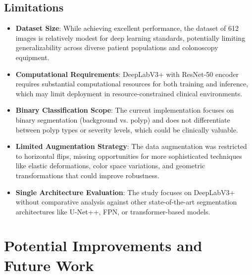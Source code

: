 \documentclass[a4paper,12pt]{report}
\begin{document}
\subsection{Limitations}
\begin{itemize}
    \item \textbf{Dataset Size}: While achieving excellent performance, the dataset of 612 images is relatively modest for deep learning standards, potentially limiting generalizability across diverse patient populations and colonoscopy equipment.
    \item \textbf{Computational Requirements}: DeepLabV3+ with ResNet-50 encoder requires substantial computational resources for both training and inference, which may limit deployment in resource-constrained clinical environments.
    \item \textbf{Binary Classification Scope}: The current implementation focuses on binary segmentation (background vs. polyp) and does not differentiate between polyp types or severity levels, which could be clinically valuable.
    \item \textbf{Limited Augmentation Strategy}: The data augmentation was restricted to horizontal flips, missing opportunities for more sophisticated techniques like elastic deformations, color space variations, and geometric transformations that could improve robustness.
    \item \textbf{Single Architecture Evaluation}: The study focuses on DeepLabV3+ without comparative analysis against other state-of-the-art segmentation architectures like U-Net++, FPN, or transformer-based models.
\end{itemize}

\section{Potential Improvements and Future Work}
\end{document}
